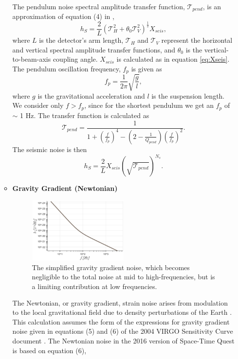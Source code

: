 \documentclass{article}
\begin{document}
\begin{itemize}
\begin{itemize}
    The pendulum noise spectral amplitude transfer function, $\mathcal{T}_{pend}$, is an approximation of equation (4) in \cite{VIRGO},
    \[
    h_{S} = \frac{2}{L}\left(\mathcal{T}_{H}^2 + \theta_0\mathcal{T}_V^2\right)^{\frac{1}{2}}X_{seis},
    \]
    where $L$ is the detector's arm length, $\mathcal{T}_H$ and $\mathcal{T}_V$ represent the horizontal and vertical spectral amplitude transfer functions, and $\theta_0$ is the vertical-to-beam-axis coupling angle. $X_{seis}$ is calculated as in equation \ref{eq:Xseis}.
    The pendulum oscillation frequency, $f_{p}$ is given as
    \[
    f_{p} = \frac{1}{2\pi}\sqrt{\frac{g}{l}} ,
    \] 
    where $g$ is the gravitational acceleration and $l$ is the suspension length. We consider only $f > f_p$, since for the shortest pendulum we get an $f_p$ of $\sim$ 1 Hz. The transfer function is calculated as
    \[
    \mathcal{T}_{pend} = \frac{1}{1 + \left(\frac{f}{f_{p}}\right)^4 - \left(2 - \frac{1}{Q_{pend}}\right)\left(\frac{f}{f_{p}}\right)^2}.
    \]
        The seismic noise is then
    \begin{equation}
        \label{eqn::seismic}
        h_{S} = \frac{2}{L}X_{seis}\left(\sqrt{\mathcal{T}_{pend}}\right)^{N_s}.
    \end{equation}
    \item \textbf{Gravity Gradient (Newtonian)} \par
    \begin{figure}[h!]
    \centering
    \includegraphics[width=0.5\textwidth]{SPQ_aLIGO_gravitygradient.pdf}
    \caption{The simplified gravity gradient noise, which becomes negligible to the total noise at mid to high-frequencies, but is a limiting contribution at low frequencies.}
    \label{fig:gravity}
    \end{figure}
    The Newtonian, or gravity gradient, strain noise arises from modulation to the local gravitational field due to density perturbations of the Earth \cite{advLIGO}. This calculation assumes the form of the expressions for gravity gradient noise given in equations (5) and (6) of the 2004 VIRGO Sensitivity Curve document \cite{VIRGO}. The Newtonian noise in the 2016 version of Space-Time Quest is based on equation (6),

\end{itemize}
\end{itemize}
\end{document}
